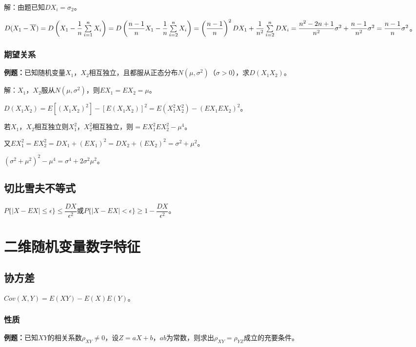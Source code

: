 \documentclass[UTF8, 12pt]{ctexart}
\begin{document}
解：由题已知$DX_i=\sigma_2$。

$D(X_1-\overline{X})=D\left(X_1-\dfrac{1}{n}\sum\limits_{i=1}^nX_i\right)=D\left(\dfrac{n-1}{n}X_1-\dfrac{1}{n}\sum\limits_{i=2}^nX_i\right)=\left(\dfrac{n-1}{n}\right)^2\\DX_1+\dfrac{1}{n^2}\sum\limits_{i=2}^nDX_i=\dfrac{n^2-2n+1}{n^2}\sigma^2+\dfrac{n-1}{n^2}\sigma^2=\dfrac{n-1}{n}\sigma^2$。

\subsubsection{期望关系}

\textbf{例题：}已知随机变量$X_1$，$X_2$相互独立，且都服从正态分布$N(\mu,\sigma^2)$（$\sigma>0$），求$D(X_1X_2)$。

解：$X_1$，$X_2$服从$N(\mu,\sigma^2)$，则$EX_1=EX_2=\mu$。

$D(X_1X_2)=E[(X_1X_2)^2]-[E(X_1X_2)]^2=E(X_1^2X_2^2)-(EX_1EX_2)^2$。

若$X_1$，$X_2$相互独立则$X_1^2$，$X_2^2$相互独立，则$=EX_1^2EX_2^2-\mu^4$。

又$EX_1^2=EX_2^2=DX_1+(EX_1)^2=DX_2+(EX_2)^2=\sigma^2+\mu^2$。

$(\sigma^2+\mu^2)^2-\mu^4=\sigma^4+2\sigma^2\mu^2$。

\subsection{切比雪夫不等式}

$P\{\vert X-EX\vert\leqslant\epsilon\}\leqslant\dfrac{DX}{\epsilon^2}$或$P\{\vert X-EX\vert<\epsilon\}\geqslant1-\dfrac{DX}{\epsilon^2}$。

\section{二维随机变量数字特征}

\subsection{协方差}

$Cov(X,Y)=E(XY)-E(X)E(Y)$。

\subsubsection{性质}

\textbf{例题：}已知$XY$的相关系数$\rho_{XY}\neq0$，设$Z=aX+b$，$ab$为常数，则求出$\rho_{XY}=\rho_{YZ}$成立的充要条件。
\end{document}
